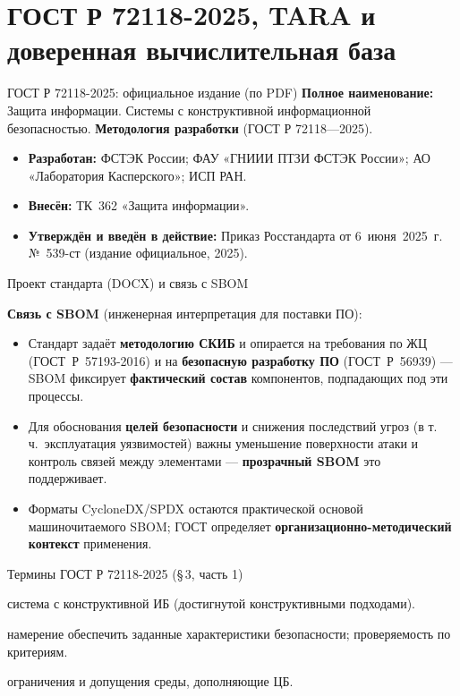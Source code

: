 \documentclass[aspectratio=169,10pt]{beamer}
\begin{document}
\section{ГОСТ Р 72118-2025, TARA и доверенная вычислительная база}

\begin{frame}{ГОСТ Р 72118-2025: официальное издание (по PDF)}
\footnotesize
\textbf{Полное наименование:} Защита информации. Системы с конструктивной информационной безопасностью. \textbf{Методология разработки} (ГОСТ Р 72118---2025).

\vspace{0.25em}
\begin{itemize}
  \setlength{\itemsep}{0.15em}
  \item \textbf{Разработан:} ФСТЭК России; ФАУ «ГНИИИ ПТЗИ ФСТЭК России»; АО «Лаборатория Касперского»; ИСП РАН.
  \item \textbf{Внесён:} ТК~362 «Защита информации».
  \item \textbf{Утверждён и введён в действие:} Приказ Росстандарта от 6~июня~2025~г. №~539-ст (издание официальное, 2025).
\end{itemize}

\end{frame}

\begin{frame}{Проект стандарта (DOCX) и связь с SBOM}

\vspace{0.35em}
\textbf{Связь с SBOM} (инженерная интерпретация для поставки ПО):
\begin{itemize}
  \setlength{\itemsep}{0.15em}
  \item Стандарт задаёт \textbf{методологию СКИБ} и опирается на требования по ЖЦ (ГОСТ~Р~57193-2016) и на \textbf{безопасную разработку ПО} (ГОСТ~Р~56939) — SBOM фиксирует \textbf{фактический состав} компонентов, подпадающих под эти процессы.
  \item Для обоснования \textbf{целей безопасности} и снижения последствий угроз (в т.\,ч.\ эксплуатация уязвимостей) важны уменьшение поверхности атаки и контроль связей между элементами — \textbf{прозрачный SBOM} это поддерживает.
  \item Форматы CycloneDX/SPDX остаются практической основой машиночитаемого SBOM; ГОСТ определяет \textbf{организационно-методический контекст} применения.
\end{itemize}
\end{frame}

\begin{frame}{Термины ГОСТ Р 72118-2025 (§\,3, часть 1)}
\scriptsize
\begin{description}
  \setlength{\itemsep}{0.1em}
  \item[СКИБ] система с конструктивной ИБ (достигнутой конструктивными подходами).
  \item[ЦБ] намерение обеспечить заданные характеристики безопасности; проверяемость по критериям.
  \item[ПБ] ограничения и допущения среды, дополняющие ЦБ.
\end{description}
\end{frame}
\end{document}
